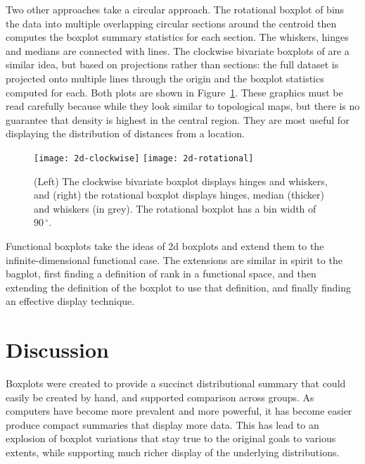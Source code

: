 \documentclass[oneside]{article}
\begin{document}
Two other approaches take a circular approach. The rotational boxplot of \citet{muth:2000} bins the data into multiple overlapping circular sections around the centroid then computes the boxplot summary statistics for each section. The whiskers, hinges and medians are connected with lines. The clockwise bivariate boxplots of \citet{corbellini:2002} are a similar idea, but based on projections rather than sections: the full dataset is projected onto multiple lines through the origin and the boxplot statistics computed for each. Both plots are shown in Figure~\ref{fig:2d-circular}. These graphics must be read carefully because while they look similar to topological maps, but there is no guarantee that density is highest in the central region. They are most useful for displaying the distribution of distances from a location.

\begin{figure}[htbp]
  \centering
  \texttt{[image: 2d-clockwise]}%
  \texttt{[image: 2d-rotational]}%

  \caption{(Left) The clockwise bivariate boxplot displays hinges and whiskers, and (right) the rotational boxplot displays hinges, median (thicker) and whiskers (in grey). The rotational boxplot has a bin width of $90\,^{\circ}$. }

  \label{fig:2d-circular}
\end{figure}

Functional boxplots \citep{hyndman:2010,sun:2011} take the ideas of 2d boxplots and extend them to the infinite-dimensional functional case. The extensions are similar in spirit to the bagplot, first finding a definition of rank in a functional space, and then extending the definition of the boxplot to use that definition, and finally finding an effective display technique.

\section{Discussion}
\label{sec:discussion}

Boxplots were created to provide a succinct distributional summary that could easily be created by hand, and supported comparison across groups. As computers have become more prevalent and more powerful, it has become easier produce compact summaries that display more data. This has lead to an explosion of boxplot variations that stay true to the original goals to various extents, while supporting much richer display of the underlying distributions.
\end{document}
